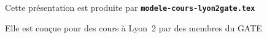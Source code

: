 
  \item Cette présentation est produite par \texttt{\textbf{modele-cours-lyon2gate.tex}}
  \item Elle est conçue pour des cours à Lyon~2 par des membres du GATE

